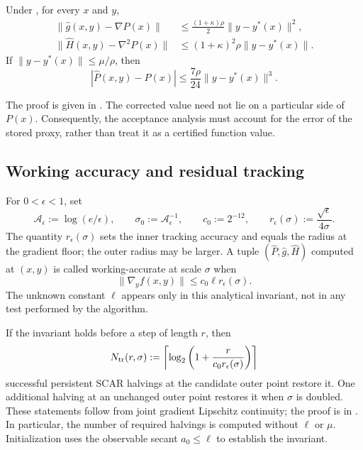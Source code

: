 \documentclass{article}
\begin{document}
\begin{lemma}
\label{lem:corrected-errors}
Under , for every $x$ and $y$,
\begin{subequations}\label{eq:corrected-error-bounds}
\begin{align}
 \|\widehat g(x,y)-\nabla P(x)\|
 &\le\frac{(1+\kappa)\rho}{2}\|y-y^*(x)\|^2,
 \label{eq:corrected-gradient-error}\\
 \|\widehat H(x,y)-\nabla^2P(x)\|
 &\le(1+\kappa)^2\rho\|y-y^*(x)\|.
 \label{eq:corrected-hessian-error}
\end{align}
\end{subequations}
If $\|y-y^*(x)\|\le\mu/\rho$, then
\begin{equation}\label{eq:corrected-value-local-error}
 |\widehat P(x,y)-P(x)|
 \le\frac{7\rho}{24}\|y-y^*(x)\|^3.
\end{equation}
\end{lemma}

The proof is given in .
The corrected value need not lie on a particular side of $P(x)$.
Consequently, the acceptance analysis must account for the error of
the stored proxy, rather than treat it as a certified function value.

\subsection{Working accuracy and residual tracking}

For $0<\epsilon<1$, set
\begin{equation}\label{eq:gs-parameters}
 \mathcal A_\epsilon:=\log(e/\epsilon),\qquad
 \sigma_0:=\mathcal A_\epsilon^{-1},\qquad
 c_0:=2^{-12},\qquad
 r_\epsilon(\sigma):=\frac{\sqrt\epsilon}{4\sigma}.
\end{equation}
The quantity $r_\epsilon(\sigma)$ sets the inner tracking accuracy
and equals the radius at the gradient floor; the outer radius may
be larger.
A tuple $(\widehat P,\widehat g,\widehat H)$ computed at $(x,y)$
is called working-accurate at scale $\sigma$ when
\begin{equation}\label{eq:gs-working-invariant}
 \|\nabla_yf(x,y)\|\le c_0\ell r_\epsilon(\sigma).
\end{equation}
The unknown constant $\ell$ appears only in this analytical
invariant, not in any test performed by the algorithm.

If the invariant holds before a step of length $r$, then
\begin{equation}\label{eq:gs-tracking-count}
 N_{\rm tr}(r,\sigma):=
 \left\lceil\log_2\left(
  1+\frac{r}{c_0r_\epsilon(\sigma)}
 \right)\right\rceil
\end{equation}
successful persistent SCAR halvings at the candidate outer point
restore it.  One additional halving at an unchanged outer point
restores it when $\sigma$ is doubled.
These statements follow from joint gradient Lipschitz continuity;
the proof is in .
In particular, the number of required halvings is computed without
$\ell$ or $\mu$.  Initialization uses the observable secant
$a_0\le\ell$ to establish the invariant.
\end{document}

